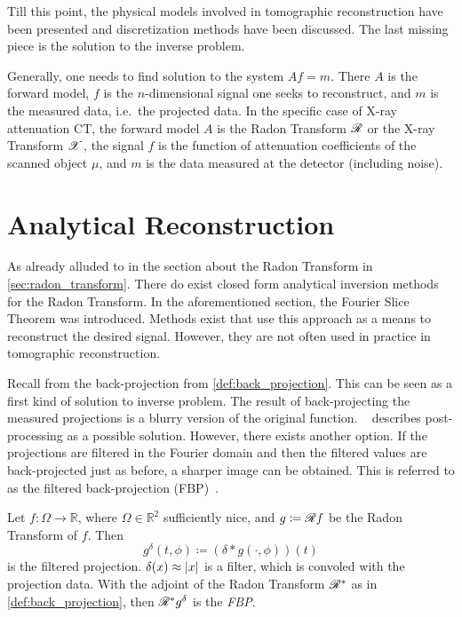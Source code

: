 Till this point, the physical models involved in tomographic reconstruction have been presented and
discretization methods have been discussed. The last missing piece is the solution to the inverse
problem.

Generally, one needs to find solution to the system \(Af = m\). There \(A\) is the forward model,
\(f\) is the \(n\)-dimensional signal one seeks to reconstruct, and \(m\) is the measured data, i.e.\
the projected data. In the specific case of X-ray attenuation CT, the forward model \(A\) is the
Radon Transform \(\mathscr{R}\) or the X-ray Transform \(\mathscr{X}\), the signal \(f\) is the function of
attenuation coefficients of the scanned object \(\mu\), and \(m\) is the data measured at the
detector (including noise).

\section{Analytical Reconstruction}\label{sec:analytical_reconstruction}

As already alluded to in the section about the Radon Transform in \autoref{sec:radon_transform}.
There do exist closed form analytical inversion methods for the Radon Transform. In the
aforementioned section, the Fourier Slice Theorem was introduced. Methods exist that use this
approach as a means to reconstruct the desired signal. However, they are not often used in practice
in tomographic reconstruction.

Recall from the back-projection from \autoref{def:back_projection}. This can be seen as a first kind
of solution to inverse problem. The result of back-projecting the measured projections is a blurry
version of the original function. \citeauthor{buzug_computed_2008}~\cite{buzug_computed_2008}
describes post-processing as a possible solution. However, there exists another option. If the
projections are filtered in the Fourier domain and then the filtered values are back-projected just
as before, a sharper image can be obtained. This is referred to as the filtered back-projection
(FBP)~\cite{ramachandran_three-dimensional_1971}.


\begin{definition}\label{def:filtered_back_projection}
	Let \(f\colon \Omega \to \mathbb{R}\), where \(\Omega \in \mathbb{R}^2\) sufficiently nice,
	and \(g \coloneq \mathscr{R} f\) be the Radon Transform of \(f\). Then
	\[ g^\delta(t, \phi) \coloneq (\delta \ast g(\cdot, \phi))(t) \]
	is the filtered projection. \(\delta(x) \approx \lvert x\rvert\) is a filter, which is convoled
	with the projection data. With the adjoint of the Radon Transform \(\mathscr{R}^\ast\) as in
	\autoref{def:back_projection}, then \(\mathscr{R}^\ast g^\delta\) is the \textit{\gls{FBP}}.
\end{definition}

